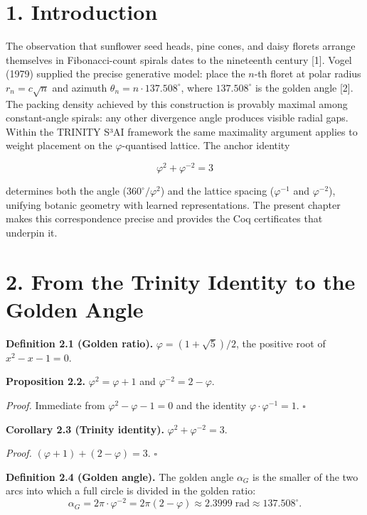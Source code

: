 \section{1. Introduction}\label{fa_07:introduction}

The observation that sunflower seed heads, pine
cones, and daisy florets arrange themselves in
Fibonacci-count spirals dates to the nineteenth
century [1]. Vogel (1979) supplied the precise
generative model: place the \(n\)-th floret at
polar radius \(r_n = c\sqrt{n}\) and azimuth
\(\theta_n = n \cdot 137.508^\circ\), where
\(137.508^\circ\) is the golden angle [2]. The
packing density achieved by this construction is
provably maximal among constant-angle spirals: any
other divergence angle produces visible radial
gaps. Within the TRINITY S³AI framework the same
maximality argument applies to weight placement on
the \(\varphi\)-quantised lattice. The anchor
identity

\[\varphi^2 + \varphi^{-2} = 3\]

determines both the angle (\(360^\circ/\varphi^2\)) and
the lattice spacing (\(\varphi^{-1}\) and
\(\varphi^{-2}\)), unifying botanic geometry with
learned representations. The present chapter makes
this correspondence precise and provides the Coq
certificates that underpin it.

\section{2. From the Trinity Identity to the
Golden
Angle}\label{fa_07:from-the-trinity-identity-to-the-golden-angle}

\textbf{Definition 2.1 (Golden ratio).}
\(\varphi = (1+\sqrt{5})/2\), the positive root of
\(x^2 - x - 1 = 0\).

\textbf{Proposition 2.2.}
\(\varphi^2 = \varphi + 1\) and
\(\varphi^{-2} = 2 - \varphi\).

\emph{Proof.} Immediate from
\(\varphi^2 - \varphi - 1 = 0\) and the identity
\(\varphi \cdot \varphi^{-1} = 1\). \(\square\)

\textbf{Corollary 2.3 (Trinity identity).}
\(\varphi^2 + \varphi^{-2} = 3\).

\emph{Proof.}
\((\varphi + 1) + (2 - \varphi) = 3\). \(\square\)

\textbf{Definition 2.4 (Golden angle).} The golden
angle \(\alpha_G\) is the smaller of the two arcs
into which a full circle is divided in the golden
ratio:
\[\alpha_G = 2\pi \cdot \varphi^{-2} = 2\pi(2 - \varphi) \approx 2.3999\;\text{rad} \approx 137.508^\circ.\]

